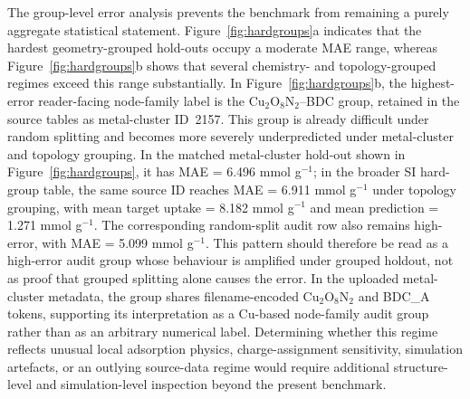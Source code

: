 \documentclass[11pt,a4paper]{article}
\begin{document}
The group-level error analysis prevents the benchmark from remaining a purely aggregate statistical statement.  Figure~\ref{fig:hardgroups}a indicates that the hardest geometry-grouped hold-outs occupy a moderate MAE range, whereas Figure~\ref{fig:hardgroups}b shows that several chemistry- and topology-grouped regimes exceed this range substantially. In Figure~\ref{fig:hardgroups}b, the highest-error reader-facing node-family label is the Cu$_2$O$_8$N$_2$--BDC group, retained in the source tables as metal-cluster ID~2157. This group is already difficult under random splitting and becomes more severely underpredicted under metal-cluster and topology grouping. In the matched metal-cluster hold-out shown in Figure~\ref{fig:hardgroups}, it has MAE = 6.496 mmol g$^{-1}$; in the broader SI hard-group table, the same source ID reaches MAE = 6.911 mmol g$^{-1}$ under topology grouping, with mean target uptake = 8.182 mmol g$^{-1}$ and mean prediction = 1.271 mmol g$^{-1}$. The corresponding random-split audit row also remains high-error, with MAE = 5.099 mmol g$^{-1}$. This pattern should therefore be read as a high-error audit group whose behaviour is amplified under grouped holdout, not as proof that grouped splitting alone causes the error. In the uploaded metal-cluster metadata, the group shares filename-encoded Cu$_2$O$_8$N$_2$ and BDC\_A tokens, supporting its interpretation as a Cu-based node-family audit group rather than as an arbitrary numerical label. Determining whether this regime reflects unusual local adsorption physics, charge-assignment sensitivity, simulation artefacts, or an outlying source-data regime would require additional structure-level and simulation-level inspection beyond the present benchmark.


\end{document}
